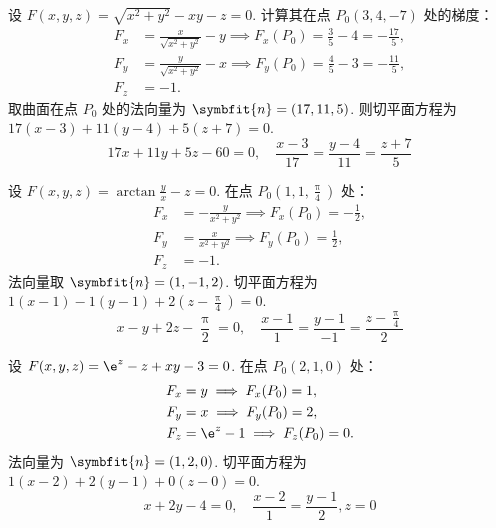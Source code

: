 \begin{solution}

    设 $F(x, y, z) = \sqrt{x^2 + y^2} - xy - z = 0$. 计算其在点 $P_0(3, 4, -7)$ 处的梯度：
    \begin{equation}
        \begin{aligned}
            F_x & = \frac{x}{\sqrt{x^2 + y^2}} - y \implies F_x(P_0) = \frac{3}{5} - 4 = -\frac{17}{5}, \\
            F_y & = \frac{y}{\sqrt{x^2 + y^2}} - x \implies F_y(P_0) = \frac{4}{5} - 3 = -\frac{11}{5}, \\
            F_z & = -1.
        \end{aligned}
    \end{equation}
    取曲面在点 $P_0$ 处的法向量为 $\symbfit{n} = (17, 11, 5)$. 则切平面方程为 $17(x - 3) + 11(y - 4) + 5(z + 7) = 0$.
    \begin{equation}
        \boxed{17x + 11y + 5z - 60 = 0, \quad \frac{x - 3}{17} = \frac{y - 4}{11} = \frac{z + 7}{5}}
    \end{equation}


    设 $F(x, y, z) = \arctan \frac{y}{x} - z = 0$. 在点 $P_0(1, 1, \frac{\uppi}{4})$ 处：
    \begin{equation}
        \begin{aligned}
            F_x & = -\frac{y}{x^2 + y^2} \implies F_x(P_0) = -\frac{1}{2}, \\
            F_y & = \frac{x}{x^2 + y^2} \implies F_y(P_0) = \frac{1}{2},   \\
            F_z & = -1.
        \end{aligned}
    \end{equation}
    法向量取 $\symbfit{n} = (1, -1, 2)$. 切平面方程为 $1(x - 1) - 1(y - 1) + 2(z - \frac{\uppi}{4}) = 0$.
    \begin{equation}
        \boxed{x - y + 2z - \frac{\uppi}{2} = 0, \quad \frac{x - 1}{1} = \frac{y - 1}{-1} = \frac{z - \frac{\uppi}{4}}{2}}
    \end{equation}


    设 $F(x, y, z) = \e^z - z + xy - 3 = 0$. 在点 $P_0(2, 1, 0)$ 处：
    \begin{equation}
        \begin{aligned}
            F_x & = y \implies F_x(P_0) = 1,        \\
            F_y & = x \implies F_y(P_0) = 2,        \\
            F_z & = \e^z - 1 \implies F_z(P_0) = 0.
        \end{aligned}
    \end{equation}
    法向量为 $\symbfit{n} = (1, 2, 0)$. 切平面方程为 $1(x - 2) + 2(y - 1) + 0(z - 0) = 0$.
    \begin{equation}
        \boxed{x + 2y - 4 = 0, \quad \frac{x - 2}{1} = \frac{y - 1}{2}, z = 0}
    \end{equation}


\end{solution}
